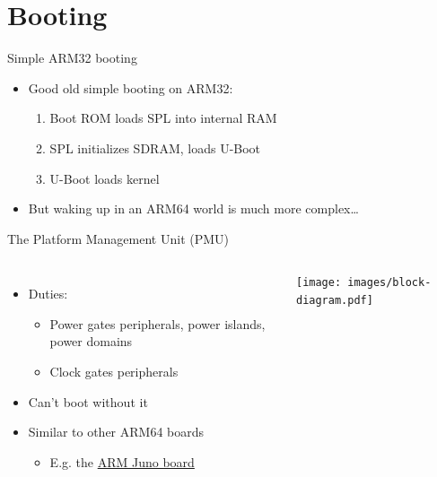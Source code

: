 \documentclass[xetex,table]{beamer}
\begin{document}
\section{Booting}

\begin{frame}{Simple ARM32 booting}
  \begin{itemize}
    \item Good old simple booting on ARM32:
    \begin{enumerate}
    \item Boot ROM loads SPL into internal RAM
    \item SPL initializes SDRAM, loads U-Boot
    \item U-Boot loads kernel
    \end{enumerate}
  \item But waking up in an ARM64 world is much more complex\dots
  \end{itemize}
\end{frame}

\begin{frame}{The Platform Management Unit (PMU)}
  \begin{columns}
  \begin{itemize}
  \item Duties:
    \begin{itemize}
    \item Power gates peripherals, power islands, power domains
    \item Clock gates peripherals
    \end{itemize}
  \item Can't boot without it
  \item Similar to other ARM64 boards
    \begin{itemize}
    \item E.g. the
      \href{https://developer.arm.com/products/system-design/development-boards/juno-development-board}{ARM
        Juno board}
    \end{itemize}
  \end{itemize}
    \texttt{[image: images/block-diagram.pdf]}
  \end{columns}
\end{frame}
\end{document}
